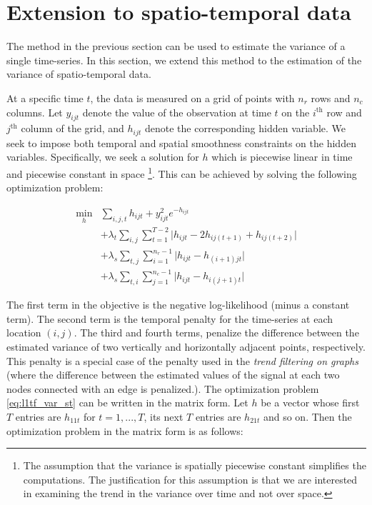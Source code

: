 \documentclass{article}
\begin{document}

\section{Extension to spatio-temporal data}
\label{sec:exten}

The method in the previous section can be used to estimate the variance of a single time-series. In this section, we extend this method to the estimation of the variance of spatio-temporal data.

At a specific time $t$, the data is measured on a grid of points with $n_r$ rows and $n_c$ columns. Let $y_{ijt}$ denote the value of the observation at time $t$ on the $i^\text{th}$ row and $j^\text{th}$ column of the grid, and $h_{ijt}$ denote the corresponding hidden variable. We seek to impose both temporal and spatial smoothness constraints on the hidden variables. Specifically, we seek a solution for $h$ which is piecewise linear in time and piecewise constant in space \footnote{The assumption that the variance is spatially piecewise constant simplifies the computations. The justification for this assumption is that we are interested in examining the trend in the variance over time and not over space.}. This can be achieved by solving the following optimization problem:

\begin{equation}
\begin{aligned}
\min_h &\sum_{i,j,t}h_{ijt}+y_{ijt}^2e^{-h_{ijt}}\\
&+\lambda_t \sum_{i,j} \sum_{t=1}^{T-2} \big|h_{ijt}-2h_{ij(t+1)}+h_{ij(t+2)}\big|\\
&+\lambda_s \sum_{t,j} \sum_{i=1}^{n_r-1} \big|h_{ijt}-h_{(i+1)jt}\big|\\
&+\lambda_s \sum_{t,i} \sum_{j=1}^{n_c-1} \big|h_{ijt}-h_{i(j+1)t}\big|
\end{aligned}
\label{eq:l1tf_var_st}
\end{equation}

The first term in the objective is the negative log-likelihood (minus a constant term). The second term is the temporal penalty for the time-series at each location $(i,j)$. The third and fourth terms, penalize the difference between the estimated variance of two vertically and horizontally adjacent points, respectively. This penalty is a special case of the penalty used in the \textit{trend filtering on graphs }\citep{wang_trend_2016} (where the difference between the estimated values of the signal at each two nodes connected with an edge is penalized.). The optimization problem \eqref{eq:l1tf_var_st} can be written in the matrix form. Let $h$ be a vector whose first $T$ entries are $h_{11t}$ for $t=1,...,T$, its next $T$ entries are $h_{21t}$ and so on. Then the optimization problem in the matrix form is as follows:
\end{document}
